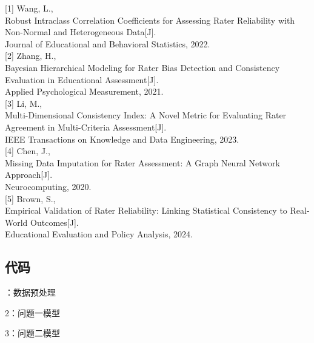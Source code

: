 \documentclass[withoutpreface,bwprint]{cumcmthesis}
\begin{document}


\begin{thebibliography}{99}

[1] Wang, L.,\\
Robust Intraclass Correlation Coefficients for Assessing Rater Reliability with Non-Normal and Heterogeneous Data[J].\\
Journal of Educational and Behavioral Statistics, 2022.\\

[2] Zhang, H.,\\
Bayesian Hierarchical Modeling for Rater Bias Detection and Consistency Evaluation in Educational Assessment[J].\\
Applied Psychological Measurement, 2021.\\

[3] Li, M.,\\
Multi-Dimensional Consistency Index: A Novel Metric for Evaluating Rater Agreement in Multi-Criteria Assessment[J].\\
IEEE Transactions on Knowledge and Data Engineering, 2023.\\

[4] Chen, J.,\\
Missing Data Imputation for Rater Assessment: A Graph Neural Network Approach[J].\\
Neurocomputing, 2020.\\

[5] Brown, S.,\\
Empirical Validation of Rater Reliability: Linking Statistical Consistency to Real-World Outcomes[J].\\
Educational Evaluation and Policy Analysis, 2024.\\

\end{thebibliography}

\begin{appendices}
\section{代码}
：数据预处理

2：问题一模型

3：问题二模型


\end{appendices}
\end{document}
